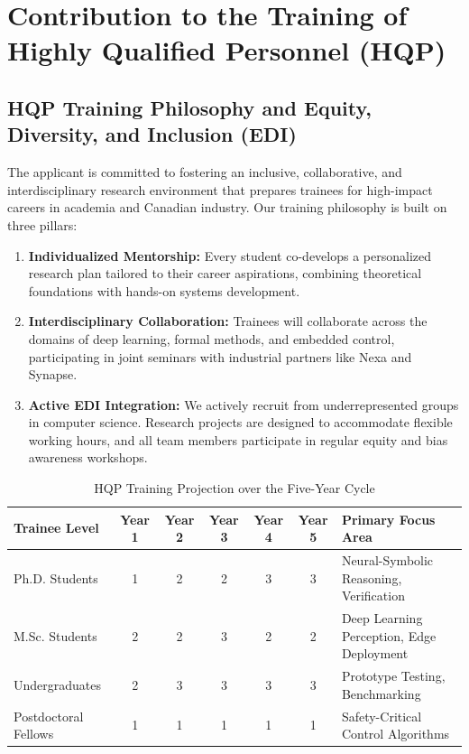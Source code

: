 \section{Contribution to the Training of Highly Qualified Personnel (HQP)}
\subsection{HQP Training Philosophy and Equity, Diversity, and Inclusion (EDI)}
The applicant is committed to fostering an inclusive, collaborative, and interdisciplinary research environment that prepares trainees for high-impact careers in academia and Canadian industry. Our training philosophy is built on three pillars:

\begin{enumerate}[leftmargin=1.5em, itemsep=3pt]
  \item \textbf{Individualized Mentorship:} Every student co-develops a personalized research plan tailored to their career aspirations, combining theoretical foundations with hands-on systems development.
  \item \textbf{Interdisciplinary Collaboration:} Trainees will collaborate across the domains of deep learning, formal methods, and embedded control, participating in joint seminars with industrial partners like Nexa and Synapse.
  \item \textbf{Active EDI Integration:} We actively recruit from underrepresented groups in computer science. Research projects are designed to accommodate flexible working hours, and all team members participate in regular equity and bias awareness workshops.
\end{enumerate}

\begin{table}[htbp]
  \centering
  \caption{HQP Training Projection over the Five-Year Cycle}
  \label{tab:hqp_projection}
  \small
  \begin{tabularx}{\textwidth}{l c c c c c X}
    \toprule
    \textbf{Trainee Level} & \textbf{Year 1} & \textbf{Year 2} & \textbf{Year 3} & \textbf{Year 4} & \textbf{Year 5} & \textbf{Primary Focus Area} \\
    \midrule
    Ph.D. Students & 1 & 2 & 2 & 3 & 3 & Neural-Symbolic Reasoning, Verification \\
    M.Sc. Students & 2 & 2 & 3 & 2 & 2 & Deep Learning Perception, Edge Deployment \\
    Undergraduates & 2 & 3 & 3 & 3 & 3 & Prototype Testing, Benchmarking \\
    Postdoctoral Fellows & 1 & 1 & 1 & 1 & 1 & Safety-Critical Control Algorithms \\
    \bottomrule
  \end{tabularx}
\end{table}


